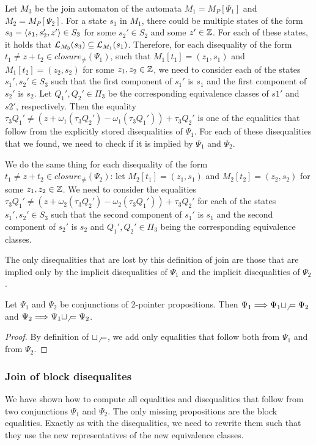 Let $M_3$ be the join automaton of the automata $M_1 = M_P[\Psi_1]$ and $M_2 = M_P[\Psi_2]$.
For a state $s_1$ in $M_1$, there could be multiple states of the form $s_3 = \langle s_1, s_2', z'\rangle \in S_3$ for some $s_2' \in S_2$ and some $z' \in \mathbb{Z}$.
For each of these states, it holds that $\mathcal{L}_{M_3}(s_3) \subseteq \mathcal{L}_{M_1}(s_1)$.
Therefore, for each disequality of the form $t_1 \neq z + t_2 \in closure_\neq(\Psi_1)$, such that $M_1[t_1] = (z_1, s_1)$ and $M_1[t_2] = (z_2, s_2)$ for some $z_1,z_2\in \mathbb{Z}$, we need to consider
each of the states $s_1', s_2' \in S_3$ such that the first component of $s_1'$ is $s_1$ and the first component of $s_2'$ is $s_2$. Let $Q_1', Q_2' \in \Pi_3$ be the corresponding equivalence classes of $s1'$ and $s2'$, respectively.
Then the equality $\tau_3 Q_1' \neq (z + \omega_1 (\tau_3 Q_2') - \omega_1 (\tau_3 Q_1')) +\tau_3 Q_2'$ is one of the equalities that follow from the explicitly stored disequalities of $\Psi_1$.
For each of these disequalities that we found, we need to check if it is implied by $\Psi_1$ and $\Psi_2$.

We do the same thing for each disequality of the form $t_1 \neq z + t_2 \in closure_\neq(\Psi_2)$:
let $M_2[t_1] = (z_1, s_1)$ and $M_2[t_2] = (z_2, s_2)$ for some $z_1,z_2\in \mathbb{Z}$.
We need to consider the equalities $\tau_3 Q_1' \neq (z + \omega_2 (\tau_3 Q_2') - \omega_2 (\tau_3 Q_1')) +\tau_3 Q_2'$ for each of the states $s_1', s_2' \in S_3$ such that the second component of $s_1'$ is $s_1$ and the second component of $s_2'$ is $s_2$ and $Q_1', Q_2' \in \Pi_3$ being the corresponding equivalence classes.

The only disequalities that are lost by this definition of join are those that are implied only by the implicit disequalities of $\Psi_1$ and the implicit disequalities of $\Psi_2$.

\begin{proposition}
    Let $\Psi_1$ and $\Psi_2$ be conjunctions of 2-pointer propositions.
    Then $\Psi_1 \Longrightarrow \Psi_1 \sqcup_\neq \Psi_2$ and $\Psi_2 \Longrightarrow \Psi_1 \sqcup_\neq \Psi_2$.
\end{proposition}

\begin{proof}
    By definition of $\sqcup_\neq$, we add only equalities that follow both from $\Psi_1$ and from $\Psi_2$.
\end{proof}

\subsubsection{Join of block disequalites}
We have shown how to compute all equalities and disequalities that follow from two conjunctions $\Psi_1$ and $\Psi_2$.
The only missing propositions are the block equalities.
Exactly as with the disequalities, we need to rewrite them such that they use the new representatives of the new equivalence classes.

